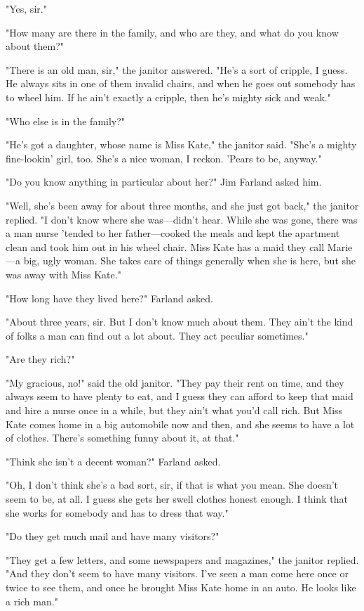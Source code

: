 \documentclass{novel}
\begin{document}
"Yes, sir."

"How many are there in the family, and who are they, and what do you know about them?"

"There is an old man, sir," the janitor answered. "He's a sort of cripple, I guess. He always sits in one of them invalid chairs, and when he goes out somebody has to wheel him. If he ain't exactly a cripple, then he's mighty sick and weak."

"Who else is in the family?"

"He's got a daughter, whose name is Miss Kate," the janitor said. "She's a mighty fine-lookin' girl, too. She's a nice woman, I reckon. 'Pears to be, anyway."

"Do you know anything in particular about her?" Jim Farland asked him.

"Well, she's been away for about three months, and she just got back," the janitor replied. "I don't know where she was---didn't hear. While she was gone, there was a man nurse 'tended to her father---cooked the meals and kept the apartment clean and took him out in his wheel chair. Miss Kate has a maid they call Marie---a big, ugly woman. She takes care of things generally when she is here, but she was away with Miss Kate."

"How long have they lived here?" Farland asked.

"About three years, sir. But I don't know much about them. They ain't the kind of folks a man can find out a lot about. They act peculiar sometimes."

"Are they rich?"

"My gracious, no!" said the old janitor. "They pay their rent on time, and they always seem to have plenty to eat, and I guess they can afford to keep that maid and hire a nurse once in a while, but they ain't what you'd call rich. But Miss Kate comes home in a big automobile now and then, and she seems to have a lot of clothes. There's something funny about it, at that."

"Think she isn't a decent woman?" Farland asked.

"Oh, I don't think she's a bad sort, sir, if that is what you mean. She doesn't seem to be, at all. I guess she gets her swell clothes honest enough. I think that she works for somebody and has to dress that way."

"Do they get much mail and have many visitors?"

"They get a few letters, and some newspapers and magazines," the janitor replied. "And they don't seem to have many visitors. I've seen a man come here once or twice to see them, and once he brought Miss Kate home in an auto. He looks like a rich man."
\end{document}
